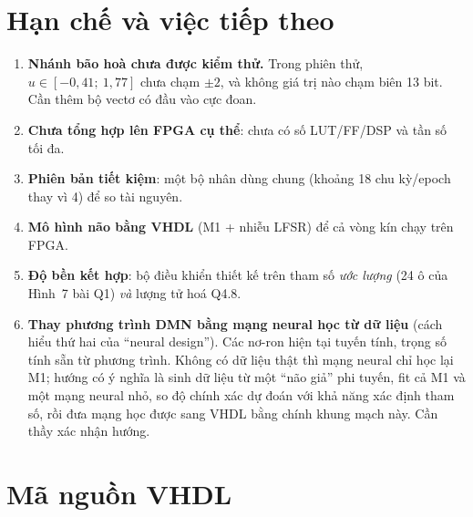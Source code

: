 \documentclass[11pt,a4paper]{article}
\newcommand{\code}[1]{\texttt{#1}}
\begin{document}
\section{Hạn chế và việc tiếp theo}
\label{sec:next}

\begin{enumerate}
  \item \textbf{Nhánh bão hoà chưa được kiểm thử.} Trong phiên thử, $u\in[-0{,}41;\ 1{,}77]$ chưa chạm
        $\pm2$, và không giá trị nào chạm biên 13 bit. Cần thêm bộ vectơ có đầu vào cực đoan.
  \item \textbf{Chưa tổng hợp lên FPGA cụ thể}: chưa có số LUT/FF/DSP và tần số tối đa.
  \item \textbf{Phiên bản tiết kiệm}: một bộ nhân dùng chung (khoảng 18 chu kỳ/epoch thay vì 4) để so tài nguyên.
  \item \textbf{Mô hình não bằng VHDL} (M1 + nhiễu LFSR) để cả vòng kín chạy trên FPGA.
  \item \textbf{Độ bền kết hợp}: bộ điều khiển thiết kế trên tham số \emph{ước lượng} (24 ô của Hình~7 bài Q1)
        \emph{và} lượng tử hoá Q4.8.
  \item \textbf{Thay phương trình DMN bằng mạng neural học từ dữ liệu} (cách hiểu thứ hai của ``neural design'').
        Các nơ-ron hiện tại tuyến tính, trọng số tính sẵn từ phương trình. Không có dữ liệu thật thì mạng neural
        chỉ học lại M1; hướng có ý nghĩa là sinh dữ liệu từ một ``não giả'' phi tuyến, fit cả M1 và một mạng
        neural nhỏ, so độ chính xác dự đoán với khả năng xác định tham số, rồi đưa mạng học được sang VHDL bằng
        chính khung mạch này. Cần thầy xác nhận hướng.
\end{enumerate}

\appendix
\section{Mã nguồn VHDL}





\end{document}
